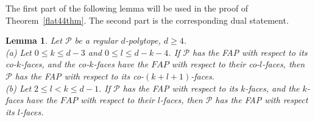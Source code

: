 \documentclass[12pt]{amsart}
\newtheorem{lemma}[theorem]{Lemma}
\theoremstyle{definition}
\begin{document}
The first part of the following lemma will be used in the proof of Theorem~\ref{flat44thm}. The second part is the corresponding dual statement.

\begin{lemma} 
\label{lemher}
Let $\mathcal{P}$ be a regular $d$-polytope, $d\geq 4$. \\[.03in]
(a) Let $0\leq k\leq d-3$ and $0\leq l\leq d-k-4$. If $\mathcal{P}$ has the FAP with respect to its co-$k$-faces, and the co-$k$-faces have the $FAP$ with respect to their co-$l$-faces, then $\mathcal{P}$ has the FAP with respect to its co-$(k+l+1)$-faces.\\[.03in]
(b) Let $2\leq l<k\leq d-1$. If $\mathcal{P}$ has the FAP with respect to its $k$-faces, and the $k$-faces have the $FAP$ with respect to their $l$-faces, then $\mathcal{P}$ has the FAP with respect its $l$-faces.
\end{lemma}
\end{document}
